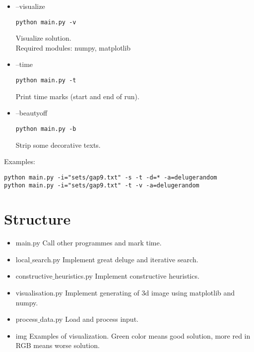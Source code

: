 \documentclass{article}
\begin{document}
\begin{itemize}
\item{--visualize}
\begin{verbatim}python main.py -v\end{verbatim}
Visualize solution.\\
Required modules: numpy, matplotlib

\item{--time}
\begin{verbatim}python main.py -t\end{verbatim}
Print time marks (start and end of run).

\item{--beautyoff}
\begin{verbatim}python main.py -b\end{verbatim}
Strip some decorative texts.

\end{itemize}

Examples:
\begin{verbatim}
python main.py -i="sets/gap9.txt" -s -t -d=* -a=delugerandom
python main.py -i="sets/gap9.txt" -t -v -a=delugerandom
\end{verbatim}

\section{Structure}
\begin{itemize}
    \item{main.py} Call other programmes and mark time.
    \item{local$\_{}$search.py} Implement great deluge and iterative search.
    \item{constructive$\_{}$heuristics.py} Implement constructive heuristics.
    \item{visualisation.py} Implement generating of 3d image using matplotlib and numpy.
    \item{process$\_{}$data.py} Load and process input.
    \item{img} Examples of visualization. Green color means good solution, more red in RGB means worse solution. 
\end{itemize}
\end{document}
